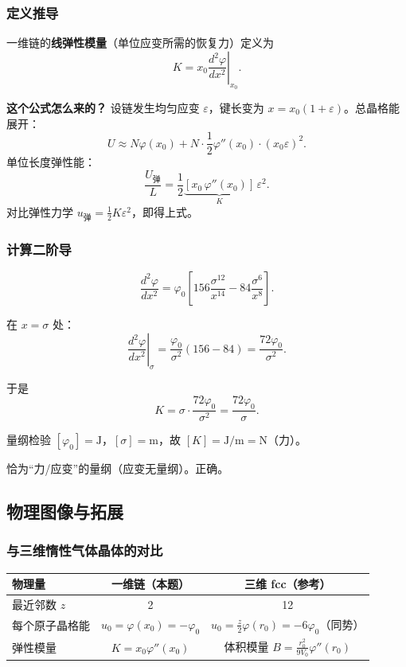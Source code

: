 \subsubsection{定义推导}

一维链的\textbf{线弹性模量}（单位应变所需的恢复力）定义为
\[
  K = x_0 \left.\frac{d^2\varphi}{dx^2}\right|_{x_0}.
\]

\textbf{这个公式怎么来的？} 设链发生均匀应变 $\varepsilon$，键长变为 $x = x_0(1+\varepsilon)$。总晶格能展开：
\[
  U \approx N\varphi(x_0) + N\cdot\frac{1}{2}\varphi''(x_0)\cdot(x_0\varepsilon)^2.
\]
单位长度弹性能：
\[
  \frac{U_{\text{弹}}}{L} = \frac{1}{2}\underbrace{[x_0\,\varphi''(x_0)]}_{K}\,\varepsilon^2.
\]
对比弹性力学 $u_{\text{弹}} = \frac{1}{2}K\varepsilon^2$，即得上式。

\subsubsection{计算二阶导}

\[
  \frac{d^2\varphi}{dx^2} = \varphi_0 \left[ 156\frac{\sigma^{12}}{x^{14}} - 84\frac{\sigma^6}{x^8} \right].
\]

在 $x = \sigma$ 处：
\[
  \left.\frac{d^2\varphi}{dx^2}\right|_{\sigma}
  = \frac{\varphi_0}{\sigma^2}(156 - 84)
  = \frac{72\varphi_0}{\sigma^2}.
\]

于是
\[
  K = \sigma \cdot \frac{72\varphi_0}{\sigma^2} = \boxed{\frac{72\varphi_0}{\sigma}}.
\]

\begin{tipbox}{量纲检验}
$[\varphi_0] = \text{J}$，$[\sigma] = \text{m}$，故 $[K] = \text{J/m} = \text{N}$（力）。

恰为``力/应变''的量纲（应变无量纲）。正确。
\end{tipbox}

\subsection{物理图像与拓展}

\subsubsection{与三维惰性气体晶体的对比}

\begin{center}
\renewcommand{\arraystretch}{1.5}
\begin{tabular}{|l|c|c|}
\hline
\textbf{物理量} & \textbf{一维链（本题）} & \textbf{三维 fcc（参考）} \\
\hline
最近邻数 $z$ & 2 & 12 \\
每个原子晶格能 & $u_0 = \varphi(x_0) = -\varphi_0$ & $u_0 = \frac{z}{2}\varphi(r_0) = -6\varphi_0$（同势） \\
弹性模量 & $K = x_0\varphi''(x_0)$ & 体积模量 $B = \frac{r_0^2}{9V_0}\varphi''(r_0)$ \\
\hline
\end{tabular}
\end{center}

